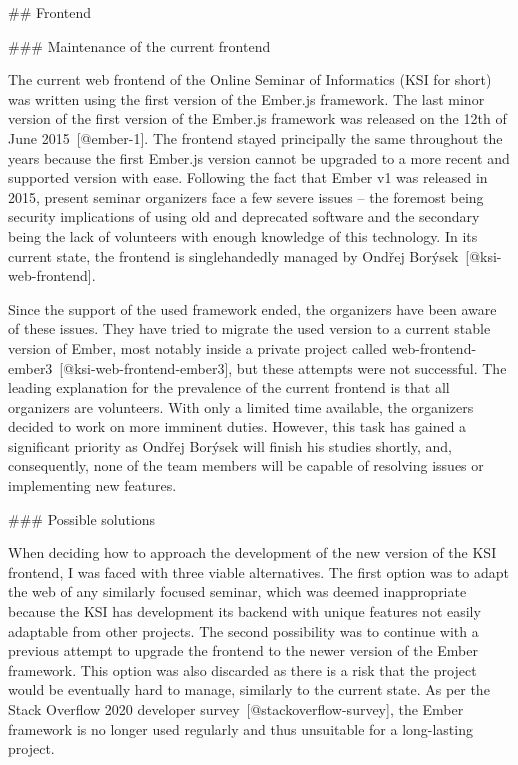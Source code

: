 \documentclass[
  digital, %
  oneside, %
  lof,     %
  lot,     %
]{fithesis4}
\begin{document}
## Frontend

### Maintenance of the current frontend

The current web frontend of the Online Seminar of Informatics (KSI for short) was written using the first version of the Ember.js framework. The last minor version of the first version of the Ember.js framework was released on the 12th of June 2015~[@ember-1]. The frontend stayed principally the same throughout the years because the first Ember.js version cannot be upgraded to a more recent and supported version with ease. Following the fact that Ember v1 was released in 2015, present seminar organizers face a few severe issues -- the foremost being security implications of using old and deprecated software and the secondary being the lack of volunteers with enough knowledge of this technology. In its current state, the frontend is singlehandedly managed by Ondřej Borýsek~[@ksi-web-frontend].

Since the support of the used framework ended, the organizers have been aware of these issues. They have tried to migrate the used version to a current stable version of Ember, most notably inside a private project called web-frontend-ember3~[@ksi-web-frontend-ember3], but these attempts were not successful. The leading explanation for the prevalence of the current frontend is that all organizers are volunteers. With only a limited time available, the organizers decided to work on more imminent duties. However, this task has gained a significant priority as Ondřej Borýsek will finish his studies shortly, and, consequently, none of the team members will be capable of resolving issues or implementing new features.

### Possible solutions

When deciding how to approach the development of the new version of the KSI frontend, I was faced with three viable alternatives. The first option was to adapt the web of any similarly focused seminar, which was deemed inappropriate because the KSI has development its backend with unique features not easily adaptable from other projects. The second possibility was to continue with a previous attempt to upgrade the frontend to the newer version of the Ember framework. This option was also discarded as there is a risk that the project would be eventually hard to manage, similarly to the current state. As per the Stack Overflow 2020 developer survey~[@stackoverflow-survey], the Ember framework is no longer used regularly and thus unsuitable for a long-lasting project.
\end{document}
